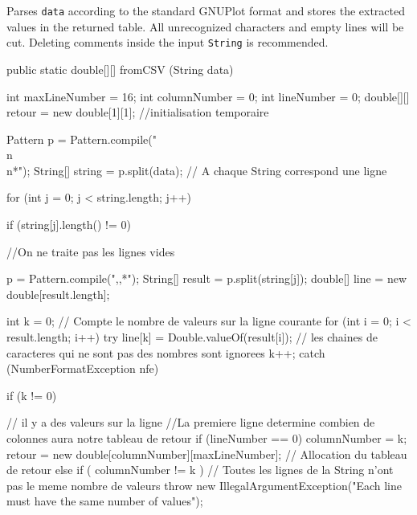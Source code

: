 \begin{tabb}
   Parses \texttt{data} according to the standard GNUPlot format and stores
  the extracted values in the returned table. All unrecognized characters
   and empty lines will be cut. Deleting comments inside the input
   \texttt{String} is recommended.
\end{tabb}
\begin{htmlonly}
\end{htmlonly}
\begin{code}

   public static double[][] fromCSV (String data) \begin{hide} {
      int maxLineNumber = 16;
      int columnNumber = 0;
      int lineNumber = 0;
      double[][] retour = new double[1][1]; //initialisation temporaire

      Pattern p = Pattern.compile("\\n\\n*");
      String[] string = p.split(data); // A chaque String correspond une ligne

      for (int j = 0; j < string.length; j++) {
         if (string[j].length() != 0) {
            //On ne traite pas les lignes vides

            p = Pattern.compile(",,*");
            String[] result = p.split(string[j]);
            double[] line = new double[result.length];

            int k = 0; // Compte le nombre de valeurs sur la ligne courante
            for (int i = 0; i < result.length; i++) {
               try {
                  line[k] = Double.valueOf(result[i]);   // les chaines de caracteres qui ne sont pas des nombres sont ignorees
                  k++;
               } catch (NumberFormatException nfe) {}
            }

            if (k != 0) { // il y a des valeurs sur la ligne
               //La premiere ligne determine combien de colonnes aura notre tableau de retour
               if (lineNumber == 0) {
                  columnNumber = k;
                  retour = new double[columnNumber][maxLineNumber]; // Allocation du tableau de retour
               } else if ( columnNumber != k ) // Toutes les lignes de la String n'ont pas le meme nombre de valeurs
                  throw new IllegalArgumentException("Each line must have the same number of values");

}}}}
\end{hide}
\end{code}
